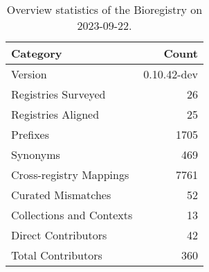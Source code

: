 \begin{table}
\caption{Overview statistics of the Bioregistry on 2023-09-22.}
\label{tab:bioregistry-summary}
\begin{tabular}{lr}
\toprule
Category & Count \\
\midrule
Version & 0.10.42-dev \\
Registries Surveyed & 26 \\
Registries Aligned & 25 \\
Prefixes & 1705 \\
Synonyms & 469 \\
Cross-registry Mappings & 7761 \\
Curated Mismatches & 52 \\
Collections and Contexts & 13 \\
Direct Contributors & 42 \\
Total Contributors & 360 \\
\bottomrule
\end{tabular}
\end{table}
